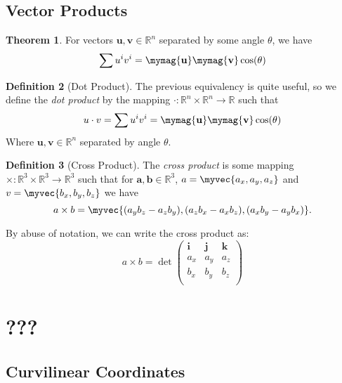 \documentclass[11pt]{article}
\theoremstyle{definition}
\newtheorem{theorem}{Theorem}[section]
\newtheorem{definition}[theorem]{Definition}
\begin{document}
\subsection{Vector Products}
\begin{theorem}
    For vectors $\mathbf{u},\mathbf{v} \in \mathbb{R}^n$ separated by some
    angle $\theta$, we have
    \begin{equation*}
        \sum{u^i v^i} = \mymag{\mathbf{u}}\mymag{\mathbf{v}}\cos(\theta)
    \end{equation*}
\end{theorem}
\begin{definition}[Dot Product]
    The previous equivalency is quite useful, so we define the \emph{dot
    product} by the mapping $\boldsymbol{\cdot} : \mathbb{R}^n \times
    \mathbb{R}^n \to \mathbb{R}$ such that
    \begin{equation*}
        u \cdot v = \sum{u^i v^i} = \mymag{\mathbf{u}}\mymag{\mathbf{v}}\cos(\theta)
    \end{equation*}
    Where $\mathbf{u},\mathbf{v} \in \mathbb{R}^n$ separated by angle
    $\theta$.
\end{definition}
\begin{definition}[Cross Product]
    The \emph{cross product} is some mapping $\times : \mathbb{R}^3 \times
    \mathbb{R}^3 \to \mathbb{R}^3$ such that for $\mathbf{a,b} \in
    \mathbb{R}^3$, $a = \myvec{a_x,a_y,a_z}$ and $v = \myvec{b_x,b_y,b_z}$
    we have
    \begin{equation*}
        a \times b = \myvec{(a_y b_z - a_z b_y), (a_z b_x - a_x b_z), (a_x
        b_y - a_y b_x)}.
    \end{equation*}
\end{definition}
By abuse of notation, we can write the cross product as:
\begin{equation*}
    a \times b = \det
    \begin{pmatrix} 
    \mathbf{i}       & \mathbf{j}   & \mathbf{k}   \\
    a_x              & a_y          & a_z          \\
    b_x              & b_y          & b_z          \\
    \end{pmatrix}
\end{equation*}

\section{???}
\subsection{Curvilinear Coordinates}
\end{document}

